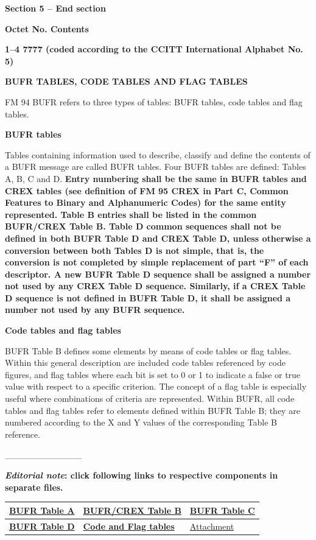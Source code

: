 \textbf{Section 5 -- End section}

\textbf{Octet No. Contents}

\textbf{1--4 7777 (coded according to the CCITT International Alphabet No. 5)}

\textbf{BUFR TABLES, CODE TABLES AND FLAG TABLES}

FM 94 BUFR refers to three types of tables: BUFR tables, code tables and flag tables.

\textbf{BUFR tables}

Tables containing information used to describe, classify and define the contents of a BUFR message are called BUFR tables. Four BUFR tables are defined: Tables A, B, C and D. \textbf{Entry numbering shall be the same in BUFR tables and CREX tables (see definition of FM 95 CREX in Part C, Common Features to Binary and Alphanumeric Codes) for the same entity represented. Table B entries shall be listed in the common BUFR/CREX Table B. Table D common sequences shall not be defined in both BUFR Table D and CREX Table D, unless otherwise a conversion between both Tables D is not simple, that is, the conversion is not completed by simple replacement of part ``F'' of each descriptor. A new BUFR Table D sequence shall be assigned a number not used by any CREX Table D sequence. Similarly, if a CREX Table D sequence is not defined in BUFR Table D, it shall be assigned a number not used by any BUFR sequence.}

\textbf{Code tables and flag tables}

BUFR Table B defines some elements by means of code tables or flag tables. Within this general description are included code tables referenced by code figures, and flag tables where each bit is set to 0 or 1 to indicate a false or true value with respect to a specific criterion. The concept of a flag table is especially useful where combinations of criteria are represented. Within BUFR, all code tables and flag tables refer to elements defined within BUFR Table B; they are numbered according to the X and Y values of the corresponding Table B reference.

\_\_\_\_\_\_\_\_\_\_\_\_

\textbf{{\emph{Editorial note}: click following links to respective components in separate files.}}

\begin{longtable}[]{@{}lll@{}}
\toprule
\href{WMO306_vI2_BUFR_TableA_en.docx}{\textbf{BUFR Table A}} & \href{WMO306_vI2_BUFRCREX_TableB_en.docx}{\textbf{BUFR/CREX Table B}} & \href{WMO306_vI2_BUFR_TableC_en.docx}{\textbf{BUFR Table C}}\tabularnewline
\midrule
\endhead
\href{WMO306_vI2_BUFR_TableD_en.docx}{\textbf{BUFR Table D}} & \href{WMO306_vI2_BUFRCREX_CodeFlag_en.docx}{\textbf{Code and Flag tables}} & \href{WMO306_vI2_BUFR_att_en.pdf}{Attachment}\tabularnewline
\bottomrule
\end{longtable}

